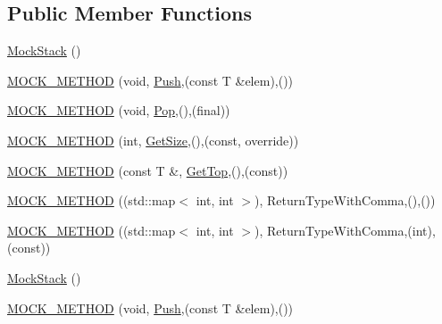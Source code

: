 \subsection*{Public Member Functions}
\begin{DoxyCompactItemize}
\item 
\mbox{\hyperlink{classtesting_1_1gmock__function__mocker__test_1_1_mock_stack_a824a05cadba13d527cf82e5bf70f57ca}{Mock\+Stack}} ()
\item 
\mbox{\hyperlink{classtesting_1_1gmock__function__mocker__test_1_1_mock_stack_a1012c16764c3ca2626032cd95d6c5f89}{M\+O\+C\+K\+\_\+\+M\+E\+T\+H\+OD}} (void, \mbox{\hyperlink{classtesting_1_1gmock__function__mocker__test_1_1_stack_interface_a94f18eeca0a9ef27ffdaffab40eaa5b7}{Push}},(const T \&elem),())
\item 
\mbox{\hyperlink{classtesting_1_1gmock__function__mocker__test_1_1_mock_stack_ae54b445bc4d2dd18520449e5edee0771}{M\+O\+C\+K\+\_\+\+M\+E\+T\+H\+OD}} (void, \mbox{\hyperlink{classtesting_1_1gmock__function__mocker__test_1_1_stack_interface_a9316d84cdc42996c0a0a2ae89b693926}{Pop}},(),(final))
\item 
\mbox{\hyperlink{classtesting_1_1gmock__function__mocker__test_1_1_mock_stack_a4283f356c5153e7e2eea0aeb424a61be}{M\+O\+C\+K\+\_\+\+M\+E\+T\+H\+OD}} (int, \mbox{\hyperlink{classtesting_1_1gmock__function__mocker__test_1_1_stack_interface_a09def067a391dbb6a35d5b52e616774c}{Get\+Size}},(),(const, override))
\item 
\mbox{\hyperlink{classtesting_1_1gmock__function__mocker__test_1_1_mock_stack_a17b01e582dc3c138e202c29ae9aec247}{M\+O\+C\+K\+\_\+\+M\+E\+T\+H\+OD}} (const T \&, \mbox{\hyperlink{classtesting_1_1gmock__function__mocker__test_1_1_stack_interface_a253773e41b8014042ab554d5f8e89e36}{Get\+Top}},(),(const))
\item 
\mbox{\hyperlink{classtesting_1_1gmock__function__mocker__test_1_1_mock_stack_ae0e6e3d10e20435b40308a5c3dd4cc9d}{M\+O\+C\+K\+\_\+\+M\+E\+T\+H\+OD}} ((std\+::map$<$ int, int $>$), Return\+Type\+With\+Comma,(),())
\item 
\mbox{\hyperlink{classtesting_1_1gmock__function__mocker__test_1_1_mock_stack_acecb9a897885e7847da425933c9cbc1d}{M\+O\+C\+K\+\_\+\+M\+E\+T\+H\+OD}} ((std\+::map$<$ int, int $>$), Return\+Type\+With\+Comma,(int),(const))
\item 
\mbox{\hyperlink{classtesting_1_1gmock__function__mocker__test_1_1_mock_stack_a824a05cadba13d527cf82e5bf70f57ca}{Mock\+Stack}} ()
\item 
\mbox{\hyperlink{classtesting_1_1gmock__function__mocker__test_1_1_mock_stack_a1012c16764c3ca2626032cd95d6c5f89}{M\+O\+C\+K\+\_\+\+M\+E\+T\+H\+OD}} (void, \mbox{\hyperlink{classtesting_1_1gmock__function__mocker__test_1_1_stack_interface_a94f18eeca0a9ef27ffdaffab40eaa5b7}{Push}},(const T \&elem),())

\end{DoxyCompactItemize}
